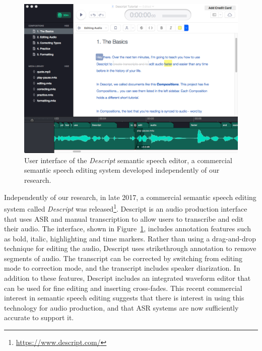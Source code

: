 \begin{figure}
\centering
  \includegraphics[width=.8\columnwidth]{figs/descript.png}
  \caption{User interface of the \textit{Descript} semantic speech editor, a commercial semantic speech editing system
  developed independently of our research.}
  \label{fig:descript}
\end{figure}

Independently of our research, in late 2017, a commercial semantic speech editing system called \textit{Descript} was
released\footnote{\url{https://www.descript.com/}}. Descript is an audio production interface that uses ASR and manual
transcription to allow users to transcribe and edit their audio. The interface, shown in Figure~\ref{fig:descript},
includes annotation features such as bold, italic, highlighting and time markers.  Rather than using a drag-and-drop
technique for editing the audio, Descript uses strikethrough annotation to remove segments of audio. The transcript can
be corrected by switching from editing mode to correction mode, and the transcript includes speaker diarization.  In
addition to these features, Descript includes an integrated waveform editor that can be used for fine editing and
inserting cross-fades.  This recent commercial interest in semantic speech editing suggests that there is interest in
using this technology for audio production, and that ASR systems are now sufficiently accurate to support it.




